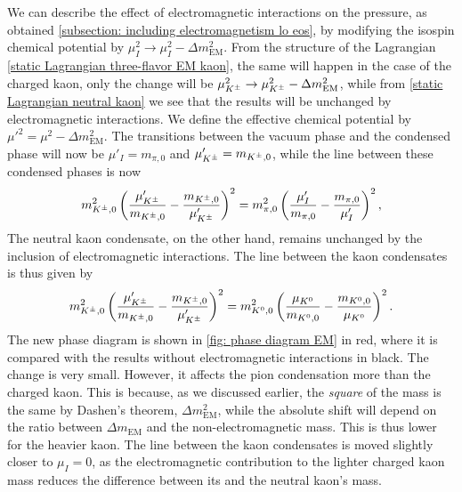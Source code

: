 We can describe the effect of electromagnetic interactions on the pressure, as obtained \autoref{subsection: including electromagnetism lo eos}, by modifying the isospin chemical potential by $\mu^2_I \rightarrow \mu^2_I - \Delta m_\text{EM}^2$.
From the structure of the Lagrangian \autoref{static Lagrangian three-flavor EM kaon}, the same will happen in the case of the charged kaon, only the change will be $\mu^2_{K^\pm} \rightarrow \mu^2_{K^\pm} - \Delta m_\text{EM}^2$, while from \autoref{static Lagrangian neutral kaon} we see that the results will be unchanged by electromagnetic interactions.
We define the effective chemical potential by ${\mu'}^2 = \mu^2 - \Delta m_\text{EM}^2$.
The transitions between the vacuum phase and the condensed phase will now be $\mu'_I = m_{\pi,0}$ and $\mu_{K^\pm}' = m_{{K^\pm},0}$, while the line between these condensed phases is now
%
\begin{equation}
    m_{{K^\pm},0}^2
    \left(
         \frac{{\mu_{K^\pm}'}}{m_{{K^\pm},0}}
         - \frac{m_{{K^\pm},0}}{{\mu_{K^\pm}'}} 
        \right)^2
    =
    m_{\pi,0}^2  
    \left( 
        \frac{{\mu_I'}}{m_{\pi,0}}
        - \frac{m_{\pi,0}}{{\mu_I'}}
    \right)^2,
\end{equation}
%
The neutral kaon condensate, on the other hand, remains unchanged by the inclusion of electromagnetic interactions.
The line between the kaon condensates is thus given by
%
\begin{equation}
    m_{{K^\pm},0}^2
    \left(
         \frac{{\mu_{K^\pm}'}}{m_{{K^\pm},0}}
         - \frac{m_{{K^\pm}, 0}}{{\mu_{K^\pm}'}} 
        \right)^2
    =
    m_{{K^0},0}^2  
    \left( 
        \frac{{\mu_{K^0}}}{m_{{K^0},0}}
        - \frac{m_{{K^0},0}}{{\mu_{K^0}}}
    \right)^2.
\end{equation}
%
The new phase diagram is shown in \autoref{fig: phase diagram EM} in red, where it is compared with the results without electromagnetic interactions in black.
The change is very small. 
However, it affects the pion condensation more than the charged kaon.
This is because, as we discussed earlier, the \emph{square} of the mass is the same by Dashen's theorem, $\Delta m_\text{EM}^2$, while the absolute shift will depend on the ratio between $\Delta m_\text{EM}$ and the non-electromagnetic mass.
This is thus lower for the heavier kaon.
The line between the kaon condensates is moved slightly closer to $\mu_I = 0$, as the electromagnetic contribution to the lighter charged kaon mass reduces the difference between its and the neutral kaon's mass.

